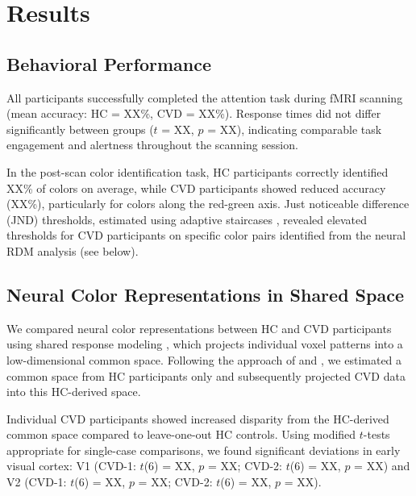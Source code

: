 
\section{Results}

\subsection{Behavioral Performance}

All participants successfully completed the attention task during fMRI scanning (mean accuracy: HC = XX\%, CVD = XX\%). Response times did not differ significantly between groups ($t$ = XX, $p$ = XX), indicating comparable task engagement and alertness throughout the scanning session.

In the post-scan color identification task, HC participants correctly identified XX\% of colors on average, while CVD participants showed reduced accuracy (XX\%), particularly for colors along the red-green axis. Just noticeable difference (JND) thresholds, estimated using adaptive staircases \cite{levitt1971}, revealed elevated thresholds for CVD participants on specific color pairs identified from the neural RDM analysis (see below).


\subsection{Neural Color Representations in Shared Space}

We compared neural color representations between HC and CVD participants using shared response modeling \cite{chen2015}, which projects individual voxel patterns into a low-dimensional common space. Following the approach of \textcite{haxby2011} and \textcite{guntupalli2016}, we estimated a common space from HC participants only and subsequently projected CVD data into this HC-derived space.

Individual CVD participants showed increased disparity from the HC-derived common space compared to leave-one-out HC controls. Using \textcite{crawford1998} modified $t$-tests appropriate for single-case comparisons, we found significant deviations in early visual cortex: V1 (CVD-1: $t$(6) = XX, $p$ = XX; CVD-2: $t$(6) = XX, $p$ = XX) and V2 (CVD-1: $t$(6) = XX, $p$ = XX; CVD-2: $t$(6) = XX, $p$ = XX).

